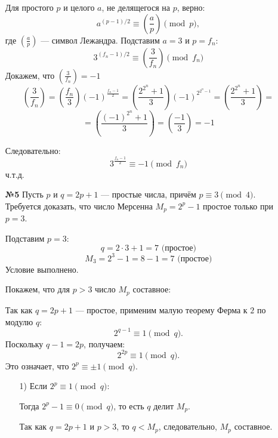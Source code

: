 \documentclass[a4paper]{article}
\renewcommand{\f}[2]{\frac{#1}{#2}}
\newcommand{\leg}[2]{\left(\f{#1}{#2}\right)}
\begin{document}
\begin{enumerate}
    Для простого \( p \) и целого \( a \), не делящегося на \( p \), верно:
    \[
    a^{(p-1)/2} \equiv \left( \frac{a}{p} \right) \pmod{p},
    \]
    где \( \left( \frac{a}{p} \right) \) — символ Лежандра.
    Подставим $a = 3$ и $p = f_n$:
    \[
    3^{(f_n-1)/2} \equiv \leg{3}{f_n}\pmod{f_n}
    \]
    Докажем, что $\leg{3}{f_n} = -1$
    $$\leg{3}{f_n} = \leg{f_n}{3} (-1)^{\f{f_n-1}{2}} = \leg{2^{2^n}+1}{3} (-1)^{2^{2^n-1}} =
     \leg{2^{2^n}+1}{3} = $$
     $$=\leg{(-1)^{2^n}+1}{3} = \leg{-1}{3} = -1$$
    
     Следовательно:
     \[
        3^{\f{f_n-1}{2}} \equiv -1\pmod{f_n}
    \]
    ч.т.д.

    \item[\textbf{№5}]
    Пусть \( p \) и \( q = 2p + 1 \) — простые числа, причём 
    \( p \equiv 3 \pmod{4} \). Требуется доказать, что число Мерсенна 
    \( M_p = 2^p - 1 \) простое только при \( p = 3 \).
    
    Подставим \( p = 3 \):  
    \[ q = 2 \cdot 3 + 1 = 7 \text{ (простое)}\] 
    \[ M_3 = 2^3 - 1 = 8 - 1 = 7 \text{ (простое)}\]
    Условие выполнено.

    Покажем, что для \( p > 3 \) число \( M_p \) составное:
    
    Так как \( q = 2p + 1 \) — простое, применим малую теорему Ферма к \( 2 \) по модулю \( q \):  
    \[
    2^{q-1} \equiv 1 \pmod{q}.
    \]  
    Поскольку \( q - 1 = 2p \), получаем:  
    \[
    2^{2p} \equiv 1 \pmod{q}.
    \]  
    Это означает, что \( 2^p \equiv \pm 1 \pmod{q} \).  

    \begin{enumerate}
        \item[1)]
        Если \( 2^p \equiv 1 \pmod{q} \):
    
        Тогда \( 2^p - 1 \equiv 0 \pmod{q} \), то есть \( q \) делит \( M_p \).  
    
        Так как \( q = 2p + 1 \) и \( p > 3 \), то \( q < M_p \), следовательно, \( M_p \) составное.  
        

\end{enumerate}
\end{enumerate}
\end{document}
